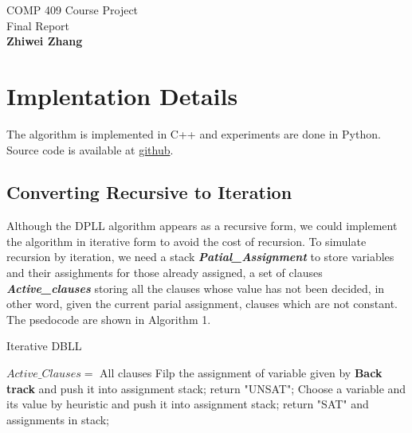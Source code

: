 \documentclass[12pt]{article}
\begin{document}
	\pagestyle{empty}
	
	\begin{center}
		{\Large COMP 409 Course Project\\
			Final Report}\\
		\bf{Zhiwei Zhang}\\
	\end{center}
	
	
	\bigskip
	
	\bigskip
	
	\noindent
	
	
	
	\bigskip
	
	\noindent
	
	\section{Implentation Details}
		The algorithm is implemented in C++ and experiments are done in Python. Source code is available at   \href{https://github.com/zzwonder/509_Project}{github}.
	\subsection{Converting Recursive to Iteration}
	Although the DPLL algorithm appears as a recursive form, we could implement the algorithm in iterative form to avoid the cost of recursion. To simulate recursion by iteration, we need a stack \textit{\textbf{Patial\_Assignment}} to store variables and their assighments for those  already assigned, a set of clauses \textbf{\textit{\textbf{Active\_clauses}}} storing all the clauses whose value has not been decided, in other word, given the current parial assignment, clauses which are not constant. The psedocode are shown in Algorithm 1.
	\begin{algorithm}[htb]
		\caption{Iterative DBLL}
		\label{P-TIME-2-OCCUR-by-Resulotion}
		\begin{algorithmic}
			\STATE $Active\_Clauses=$ All clauses
			\STATE Filp the assignment of variable given by \textbf{Back track} and push it into assignment stack;
			\ELSE 
			\STATE return "UNSAT";
			\ENDIF
			\ELSE
			\STATE Choose a variable and its value by heuristic and push it into assignment stack;
			\ENDIF
			\ENDWHILE
			\STATE return "SAT" and assignments in stack;
		\end{algorithmic}
	\end{algorithm}
\end{document}
